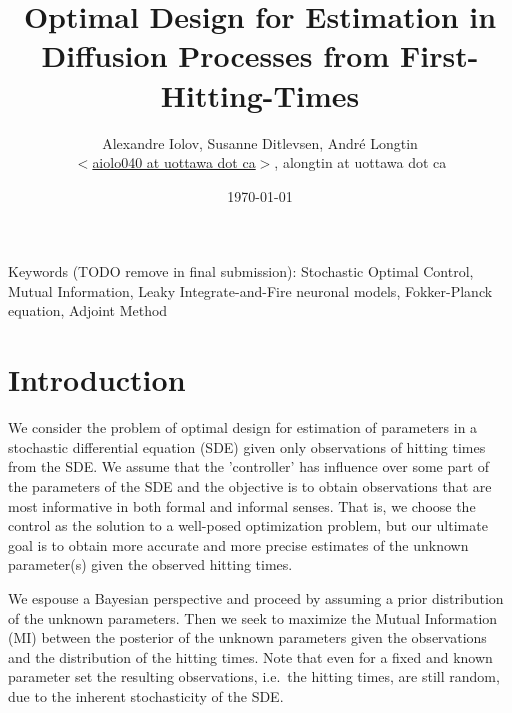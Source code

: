 \documentclass{article}
\begin{document}
\title{Optimal Design for Estimation in Diffusion Processes from
First-Hitting-Times}
\author{Alexandre Iolov, Susanne Ditlevsen, Andr\'e Longtin  \\
$<$\href{mailto:aiolo040@uottawa.ca}
		{aiolo040 at uottawa dot ca}$>$, alongtin at uottawa dot ca}

\date{\today}

\maketitle  

 
Keywords (TODO remove in final submission): Stochastic Optimal
Control, Mutual Information, Leaky Integrate-and-Fire neuronal models,
Fokker-Planck equation, Adjoint Method


\tableofcontents

\listoftables  

\listoffigures

\section{Introduction}
We consider the problem of optimal design for estimation of parameters in a
stochastic differential equation (SDE) given only observations of hitting times
from the SDE. We assume that the 'controller' has influence over some part of
the parameters of the SDE and the objective is to obtain observations that are
most informative in both formal and informal senses. That is, we choose the
control as the solution to a well-posed optimization problem, but our ultimate
goal is to obtain more accurate and more precise estimates of the unknown
parameter(s) given the observed hitting times.

We espouse a Bayesian perspective and proceed by assuming a prior
distribution of the unknown parameters. Then we seek to maximize the Mutual
Information (MI) between the posterior of the unknown parameters given the
observations and the distribution of the hitting times. Note that even for a
fixed and known parameter set the resulting observations, i.e.\ the hitting
times, are still random, due to the inherent stochasticity of the SDE. 
\end{document}
